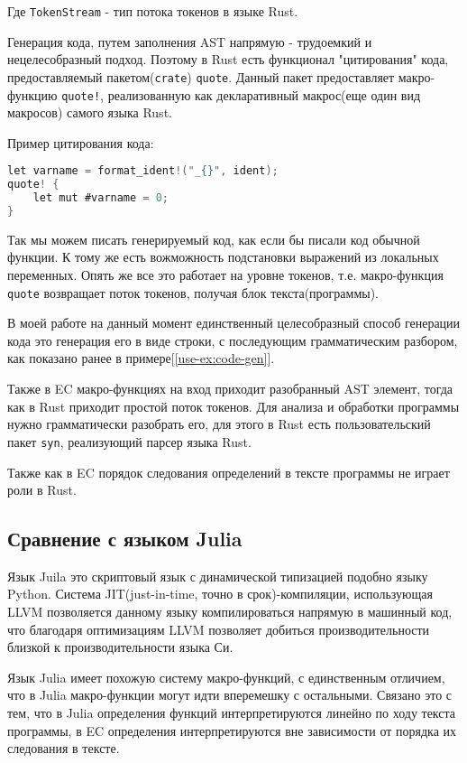 Где \verb|TokenStream| - тип потока токенов в языке Rust.

Генерация кода, путем заполнения AST напрямую - трудоемкий и нецелесобразный подход.
Поэтому в Rust есть функционал "цитирования" кода, предоставляемый пакетом(\verb|crate|) \verb|quote|\cite{rust-quote}.
Данный пакет предоставляет макро-функцию \verb|quote!|, реализованную как декларативный макрос(еще один вид макросов) самого языка Rust.

Пример цитирования кода:
\begin{lstlisting}[language=C, caption={Заголовок процедурного макроса Rust}, label={langcmp:rust:rust_quote}]
let varname = format_ident!("_{}", ident);
quote! {
    let mut #varname = 0;
}
\end{lstlisting}

Так мы можем писать генерируемый код, как если бы писали код обычной функции. К тому же есть вожможность подстановки выражений из локальных переменных.
Опять же все это работает на уровне токенов, т.е. макро-функция \verb|quote| возвращает поток токенов, получая блок текста(программы).

В моей работе на данный момент единственный целесобразный способ генерации кода это генерация его в виде строки, с последующим грамматическим разбором, как показано ранее в примере[\ref{use-ex:code-gen}].

Также в EC макро-функциях на вход приходит разобранный AST элемент, тогда как в Rust приходит простой поток токенов.
Для анализа и обработки программы нужно грамматически разобрать его, для этого в Rust есть пользовательский пакет \verb|syn|\cite{rust-syn}, реализующий парсер языка Rust.

Также как в EC порядок следования определений в тексте программы не играет роли в Rust.

\subsection{Сравнение с языком Julia}
\label{langcmp:julia}
Язык Juila это скриптовый язык с динамической типизацией подобно языку Python. Система JIT(just-in-time, точно в срок)-компиляции, использующая LLVM\cite{LLVM} позволяется данному языку компилироваться напрямую в машинный код, 
что благодаря оптимизациям LLVM позволяет добиться производительности близкой к производительности языка Си.

Язык Julia имеет похожую систему макро-функций\cite{julia-meta}, с единственным отличием, что в Julia макро-функции могут идти вперемешку с остальными. 
Связано это с тем, что в Julia определения функций интерпретируются линейно по ходу текста программы, в EC определения интерпретируются вне зависимости от порядка их следования в тексте.

